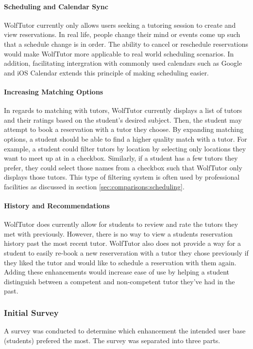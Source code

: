 \paragraph{Scheduling and Calendar Sync} WolfTutor currently only allows users
seeking a tutoring session to create and view reservations. In real life, people
change their mind or events come up such that a schedule change is in order. The
ability to cancel or reschedule reservations would make WolfTutor more
applicable to real world scheduling scenarios. In addition, facilitating
intergration with commonly used calendars such as Google and iOS Calendar
extends this principle of making scheduling easier.

\paragraph{Increasing Matching Options} In regards to matching with tutors,
WolfTutor currently displays a list of tutors and their ratings based on the
student's desired subject. Then, the student may attempt to book a reservation
with a tutor they choose. By expanding matching options, a student should be
able to find a higher quality match with a tutor. For example, a student
could filter tutors by location by selecting only locations they want to meet up
at in a checkbox. Similarly, if a student has a few tutors they prefer, they
could select those names from a checkbox such that WolfTutor only displays those
tutors. This type of filtering system is often used by professional facilities as discussed in section \ref{sec:comparisons:scheduling}.

\paragraph{History and Recommendations} WolfTutor does currently allow
for students to review and rate the tutors they met with
previously. However, there is no way to view a students reservation
history past the most recent tutor. WolfTutor also does not provide a
way for a student to easily re-book a new reserveration with a tutor
they chose previously if they liked the tutor and would like to
schedule a reservation with them again. Adding these enhancements
would increase ease of use by helping a student distinguish between a
competent and non-competent tutor they've had in the past.


\subsubsection{Initial Survey}
\label{sec:initial-survey} A survey was conducted to determine which enhancement
the intended user base (students) prefered the most. The survey was separated
into three parts.

